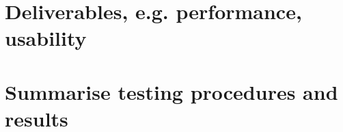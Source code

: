 \section{Deliverables, e.g. performance, usability}

\section{Summarise testing procedures and results}
